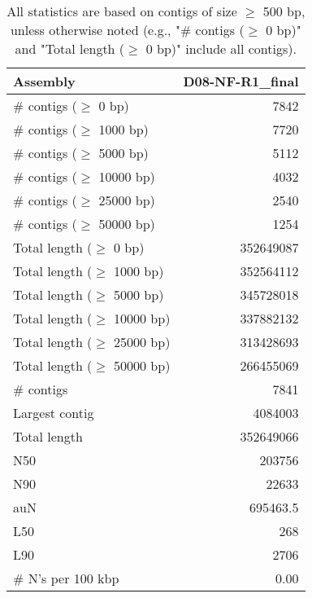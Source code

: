 \documentclass[12pt,a4paper]{article}
\begin{document}
\begin{table}[ht]
\begin{center}
\caption{All statistics are based on contigs of size $\geq$ 500 bp, unless otherwise noted (e.g., "\# contigs ($\geq$ 0 bp)" and "Total length ($\geq$ 0 bp)" include all contigs).}
\begin{tabular}{|l*{1}{|r}|}
\hline
Assembly & D08-NF-R1\_final \\ \hline
\# contigs ($\geq$ 0 bp) & 7842 \\ \hline
\# contigs ($\geq$ 1000 bp) & 7720 \\ \hline
\# contigs ($\geq$ 5000 bp) & 5112 \\ \hline
\# contigs ($\geq$ 10000 bp) & 4032 \\ \hline
\# contigs ($\geq$ 25000 bp) & 2540 \\ \hline
\# contigs ($\geq$ 50000 bp) & 1254 \\ \hline
Total length ($\geq$ 0 bp) & 352649087 \\ \hline
Total length ($\geq$ 1000 bp) & 352564112 \\ \hline
Total length ($\geq$ 5000 bp) & 345728018 \\ \hline
Total length ($\geq$ 10000 bp) & 337882132 \\ \hline
Total length ($\geq$ 25000 bp) & 313428693 \\ \hline
Total length ($\geq$ 50000 bp) & 266455069 \\ \hline
\# contigs & 7841 \\ \hline
Largest contig & 4084003 \\ \hline
Total length & 352649066 \\ \hline
N50 & 203756 \\ \hline
N90 & 22633 \\ \hline
auN & 695463.5 \\ \hline
L50 & 268 \\ \hline
L90 & 2706 \\ \hline
\# N's per 100 kbp & 0.00 \\ \hline
\end{tabular}
\end{center}
\end{table}
\end{document}
